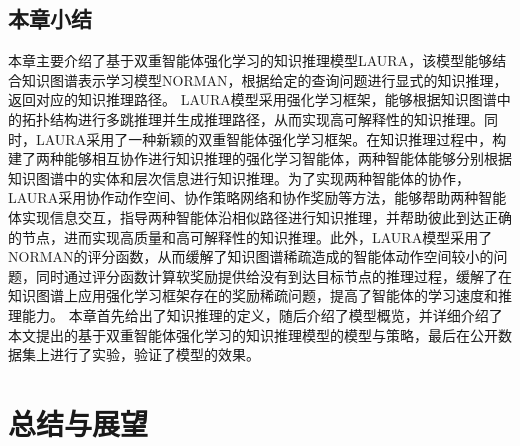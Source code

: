 \documentclass[algorithmlist, AutoFakeBold, AutoFakeSlant, figurelist, tablelist, nomlist, engineering, openany]{seuthesix} %
\begin{document}
\section{本章小结}
本章主要介绍了基于双重智能体强化学习的知识推理模型LAURA，该模型能够结合知识图谱表示学习模型NORMAN，根据给定的查询问题进行显式的知识推理，返回对应的知识推理路径。
LAURA模型采用强化学习框架，能够根据知识图谱中的拓扑结构进行多跳推理并生成推理路径，从而实现高可解释性的知识推理。同时，LAURA采用了一种新颖的双重智能体强化学习框架。在知识推理过程中，构建了两种能够相互协作进行知识推理的强化学习智能体，两种智能体能够分别根据知识图谱中的实体和层次信息进行知识推理。为了实现两种智能体的协作，LAURA采用协作动作空间、协作策略网络和协作奖励等方法，能够帮助两种智能体实现信息交互，指导两种智能体沿相似路径进行知识推理，并帮助彼此到达正确的节点，进而实现高质量和高可解释性的知识推理。此外，LAURA模型采用了NORMAN的评分函数，从而缓解了知识图谱稀疏造成的智能体动作空间较小的问题，同时通过评分函数计算软奖励提供给没有到达目标节点的推理过程，缓解了在知识图谱上应用强化学习框架存在的奖励稀疏问题，提高了智能体的学习速度和推理能力。
本章首先给出了知识推理的定义，随后介绍了模型概览，并详细介绍了本文提出的基于双重智能体强化学习的知识推理模型的模型与策略，最后在公开数据集上进行了实验，验证了模型的效果。


\chapter{总结与展望}
\end{document}
